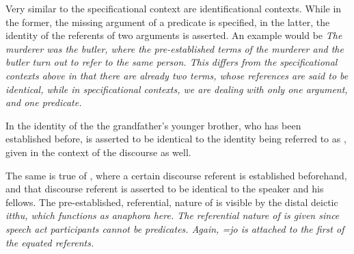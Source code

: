 % 
% 
% 
% 


Very similar to the specificational context are identificational contexts. While in the former, the missing argument of a predicate is specified, in the latter, the identity of the referents  of two arguments is asserted. An example would be \em The murderer was the butler\em, where the pre-established terms of \em the murderer \em and \em the butler \em turn out to refer to the same person. This differs from the specificational contexts above in that there are already \em two \em terms, whose references are said to be identical, while in specificational contexts, we are dealing with only one argument, and one predicate. 

In  the identity of the the grandfather's younger brother, who has been established before, is asserted to be identical to the identity being referred to as ,  given in the context of the discourse as well.



The same is true of , where a certain discourse referent is established beforehand, and that discourse referent is asserted to be identical to the speaker and his fellows. The pre-established, referential, nature of  is visible by the distal deictic \em itthu\em, which functions as anaphora here. The referential nature of  is given since speech act participants cannot be predicates. Again, \em =jo \em is attached to the first of the equated referents.

